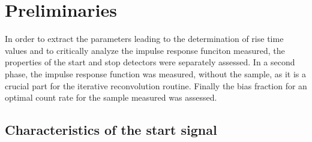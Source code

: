 


\section{Preliminaries}

In order to extract the parameters leading to the determination of rise time values and to critically analyze the impulse response funciton measured, the properties of the start and stop detectors were separately assessed. 
In a second phase, the impulse response function was measured, without the sample, as it is a crucial part for the iterative reconvolution routine.
Finally the bias fraction for an optimal count rate for the sample measured was assessed.

\subsection{Characteristics of the start signal}

